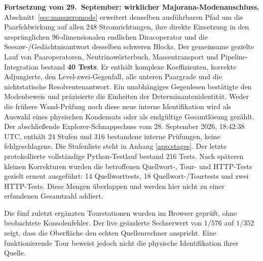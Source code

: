 \textbf{Fortsetzung vom 29.~September: wirklicher Majorana-Modenanschluss.}
Abschnitt~\ref{sec:masszeromode} erweitert denselben ausführbaren Pfad um die
Paarfeldwirkung auf allen 248 Stromrichtungen, ihre direkte Einsetzung in
den ursprünglichen 96-dimensionalen endlichen Diracoperator und die
Seesaw-/Gedächtnisantwort desselben schweren Blocks. Der gemeinsame
gezielte Lauf von Paaroperatoren, Neutrinowörterbuch, Massentransport und
Pipeline-Integration bestand \textbf{40 Tests}. Er enthält komplexe
Koeffizienten, korrekte Adjungierte, den Level-zwei-Gegenfall, alle unteren
Paargrade und die nichtstatische Resolventenantwort. Ein unabhängiges
Gegenlesen bestätigte den Modenbeweis und präzisierte die Einheiten der
Determinantenidentität. Weder die frühere Wand-Prüfung noch diese neue
interne Identifikation wird als Auswahl eines physischen Kondensats
oder als endgültige Gesamtlösung gezählt.
Der abschließende Explorer-Schnappschuss vom 28. September 2026, 18:42:38 UTC, enthält 24 Stufen und 316 bestandene interne Prüfungen, keine fehlgeschlagene. Die Stufenliste steht in Anhang \ref{app:stages}. Der letzte protokollierte vollständige Python-Testlauf bestand 216 Tests. Nach späteren kleinen Korrekturen wurden die betroffenen Quellwort-, Tour- und HTTP-Tests gezielt erneut ausgeführt: 14 Quellworttests, 18 Quellwort-/Tourtests und zwei HTTP-Tests. Diese Mengen überlappen und werden hier nicht zu einer erfundenen Gesamtzahl addiert.

Die fünf zuletzt ergänzten Tourstationen wurden im Browser geprüft, ohne beobachtete Konsolenfehler. Der live geänderte Sechserwert von $1/576$ auf $1/352$ zeigt, dass die Oberfläche den echten Quellenrechner anspricht. Eine funktionierende Tour beweist jedoch nicht die physische Identifikation ihrer Quelle.


